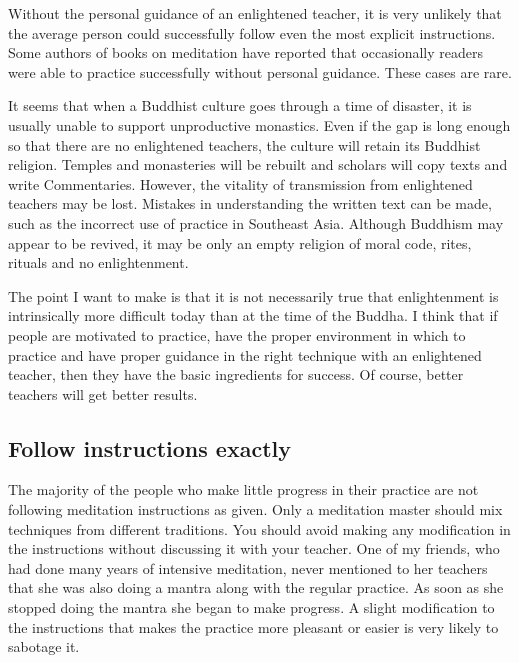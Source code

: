 \documentclass[a5paper,10pt,english]{book}
\begin{document}
\sphinxAtStartPar
Without the personal guidance of an enlightened teacher, it is very
unlikely that the average person could successfully follow even the most
explicit instructions. Some authors of books on meditation have reported
that occasionally readers were able to practice successfully without
personal guidance. These cases are rare.

\sphinxAtStartPar
It seems that when a Buddhist culture goes through a time of disaster,
it is usually unable to support unproductive monastics. Even if the gap
is long enough so that there are no enlightened teachers, the culture
will retain its Buddhist religion. Temples and monasteries will be
rebuilt and scholars will copy texts and write Commentaries. However,
the vitality of transmission from enlightened teachers may be lost.
Mistakes in understanding the written text can be made, such as the
incorrect use of  practice in Southeast Asia. Although
Buddhism may appear to be revived, it may be only an empty religion of
moral code, rites, rituals and no enlightenment.

\sphinxAtStartPar
The point I want to make is that it is not necessarily true that
enlightenment is intrinsically more difficult today than at the time of
the Buddha. I think that if people are motivated to practice, have the
proper environment in which to practice and have proper guidance in the
right technique with an enlightened teacher, then they have the basic
ingredients for success. Of course, better teachers will get better
results.


\subsection{Follow instructions exactly}
\label{\detokenize{saints:follow-instructions-exactly}}
\sphinxAtStartPar
The majority of the people who make little progress in their practice
are not following meditation instructions as given. Only a meditation
master should mix techniques from different traditions. You should avoid
making any modification in the instructions without discussing it with
your teacher. One of my friends, who had done many years of intensive
 meditation, never mentioned to her teachers that she was
also doing a mantra along with the regular practice. As soon as she
stopped doing the mantra she began to make progress. A slight
modification to the instructions that makes the practice more pleasant
or easier is very likely to sabotage it.
\end{document}
